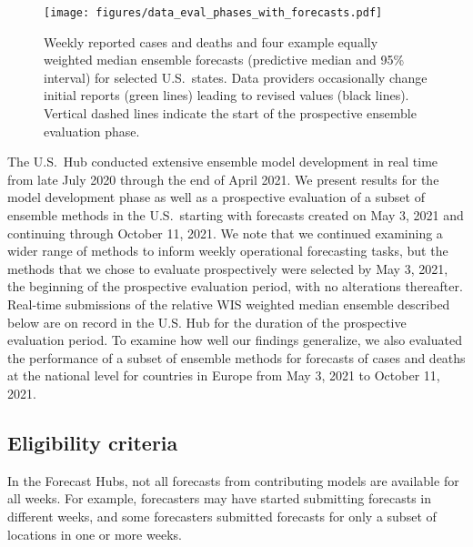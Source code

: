 \documentclass[11pt,3p,review,authoryear]{elsarticle}
\begin{document}
\begin{figure}
\texttt{[image: figures/data\_eval\_phases\_with\_forecasts.pdf]}
\caption{Weekly reported cases and deaths and four example equally weighted median ensemble forecasts (predictive median and 95\% interval) for selected U.S.\ states. Data providers occasionally change initial reports (green lines) leading to revised values (black lines). Vertical dashed lines indicate the start of the prospective ensemble evaluation phase.}
\label{fig:eval_phase_setup}
\end{figure}

The U.S.\ Hub conducted extensive ensemble model development in real time from late July 2020 through the end of April 2021. We present results for the model development phase as well as a prospective evaluation of a subset of ensemble methods in the U.S.\ starting with forecasts created on May 3, 2021 and continuing through October 11, 2021. We note that we continued examining a wider range of methods to inform weekly operational forecasting tasks, but the methods that we chose to evaluate prospectively were selected by May 3, 2021, the beginning of the prospective evaluation period, with no alterations thereafter. Real-time submissions of the relative WIS weighted median ensemble described below are on record in the U.S. Hub for the duration of the prospective evaluation period. To examine how well our findings generalize, we also evaluated the performance of a subset of ensemble methods for forecasts of cases and deaths at the national level for countries in Europe from May 3, 2021 to October 11, 2021.

\subsection{Eligibility criteria}
\label{subsec:methods_eligibility}

In the Forecast Hubs, not all forecasts from contributing models are available for all weeks. For example, forecasters may have started submitting forecasts in different weeks, and some forecasters submitted forecasts for only a subset of locations in one or more weeks.
\end{document}
